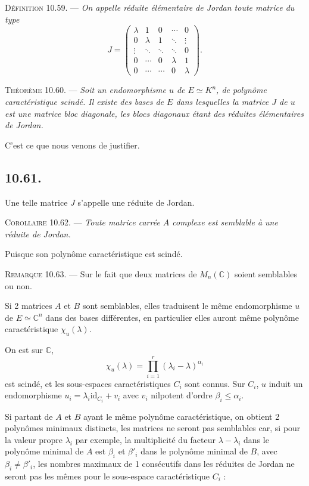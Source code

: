 \medskip\noindent\textsc{Définition 10.59.} --- \emph{On appelle réduite élémentaire de Jordan toute matrice du type
\[
J=\begin{pmatrix}
\lambda&1&0&\cdots&0\\
0&\lambda&1&\ddots&\vdots\\
\vdots&\ddots&\ddots&\ddots&0\\
0&\cdots&0&\lambda&1\\
0&\cdots&\cdots&0&\lambda
\end{pmatrix}.
\]}

\medskip\noindent\textsc{Théorème 10.60.} --- \emph{Soit un endomorphisme $u$ de $E\simeq K^n$, de polynôme caractéristique scindé. Il existe des bases de $E$ dans lesquelles la matrice $J$ de $u$ est une matrice bloc diagonale, les blocs diagonaux étant des réduites élémentaires de Jordan.}

C'est ce que nous venons de justifier. \bookend

\subsection*{10.61.}
Une telle matrice $J$ s'appelle une réduite de Jordan.

\medskip\noindent\textsc{Corollaire 10.62.} --- \emph{Toute matrice carrée $A$ complexe est semblable à une réduite de Jordan.}

Puisque son polynôme caractéristique est scindé. \bookend

\medskip\noindent\textsc{Remarque 10.63.} --- Sur le fait que deux matrices de $M_n(\mathbb C)$ soient semblables ou non.

Si 2 matrices $A$ et $B$ sont semblables, elles traduisent le même endomorphisme $u$ de $E\simeq\mathbb C^n$ dans des bases différentes, en particulier elles auront même polynôme caractéristique $\chi_u(\lambda)$.

On est sur $\mathbb C$,
\[
\chi_u(\lambda)=\prod_{i=1}^r(\lambda_i-\lambda)^{\alpha_i}
\]
est scindé, et les sous-espaces caractéristiques $C_i$ sont connus. Sur $C_i$, $u$ induit un endomorphisme $u_i=\lambda_i\mathrm{id}_{C_i}+v_i$ avec $v_i$ nilpotent d'ordre $\beta_i\le\alpha_i$.

Si partant de $A$ et $B$ ayant le même polynôme caractéristique, on obtient 2 polynômes minimaux distincts, les matrices ne seront pas semblables car, si pour la valeur propre $\lambda_i$ par exemple, la multiplicité du facteur $\lambda-\lambda_i$ dans le polynôme minimal de $A$ est $\beta_i$ et $\beta'_i$ dans le polynôme minimal de $B$, avec $\beta_i\ne\beta'_i$, les nombres maximaux de 1 consécutifs dans les réduites de Jordan ne seront pas les mêmes pour le sous-espace caractéristique $C_i$ : 

